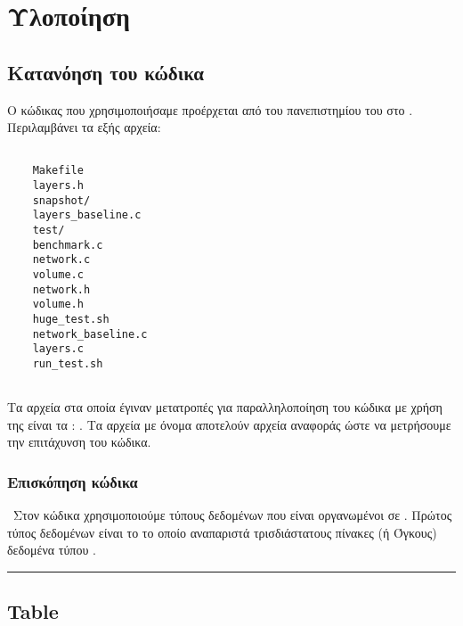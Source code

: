 \chapter{Υλοποίηση }

\section{Κατανόηση του κώδικα}

Ο κώδικας που χρησιμοποιήσαμε προέρχεται από  του πανεπιστημίου του  στο  \cite{sp19-proj4}. Περιλαμβάνει τα εξής αρχεία:
\begin{lstlisting}[backgroundcolor=\color{backcolour},breakatwhitespace=false]
    
    Makefile
    layers.h
    snapshot/
    layers_baseline.c
    test/
    benchmark.c
    network.c
    volume.c
    network.h
    volume.h
    huge_test.sh
    network_baseline.c
    layers.c
    run_test.sh
    
\end{lstlisting}

Tα αρχεία στα οποία έγιναν μετατροπές για παραλληλοποίηση του κώδικα με χρήση της  είναι τα :\emph{ }. Tα αρχεία με όνομα  αποτελούν αρχεία αναφοράς ώστε να μετρήσουμε την επιτάχυνση του κώδικα.

\subsection{Επισκόπηση κώδικα}
\
Στον κώδικα χρησιμοποιούμε τύπους δεδομένων που είναι οργανωμένοι σε .
Πρώτος τύπος δεδομένων είναι το \textbf{\en{volume\_t}} το οποίο αναπαριστά τρισδιάστατους πίνακες (ή Όγκους) δεδομένα τύπου \textbf{}. 
\empty
{}

\hrule

\section{Table}

